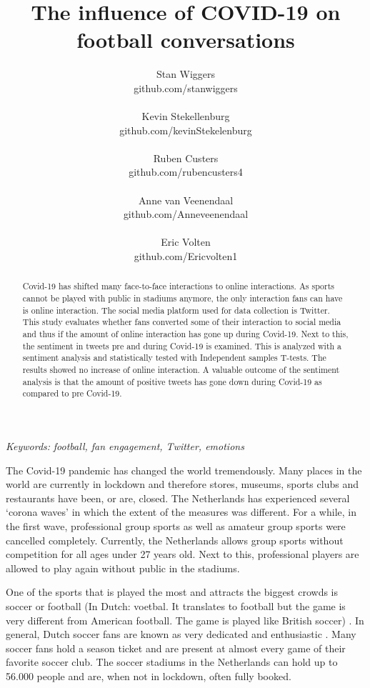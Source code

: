 \documentclass[12pt]{article}
\date{}
\title{The influence of COVID-19 on football conversations}
\author{Stan Wiggers \\ github.com/stanwiggers
\\ \\ Kevin Stekellenburg \\ github.com/kevinStekelenburg
\\ \\ Ruben Custers \\ github.com/rubencusters4
\\ \\ Anne van Veenendaal \\ github.com/Anneveenendaal
\\ \\ Eric Volten \\ github.com/Ericvolten1}
\providecommand{\keywords}[1]
{
   \small
  \textit{\hspace{-1em} Keywords: } #1
}
\begin{document}
\maketitle
\thispagestyle{fancy}
\begin{abstract}
  \noindent  Covid-19 has shifted many face-to-face interactions to online interactions. As sports cannot be played with public in stadiums anymore, the only interaction fans can have is online interaction. The social media platform used for data collection is Twitter. This study evaluates whether fans converted some of their interaction to social media and thus if the amount of online interaction has gone up during Covid-19.  Next to this, the sentiment in tweets pre and during Covid-19 is examined. This is analyzed with a sentiment analysis and statistically tested with Independent samples T-tests. The results showed no increase of online interaction. A valuable outcome of the sentiment analysis is that the amount of positive tweets has gone down during Covid-19 as compared to pre Covid-19. 
\end{abstract}

\keywords{\textit{football, fan engagement, Twitter, emotions} \vspace{8ex}}

\noindent The Covid-19 pandemic has changed the world tremendously. Many places in the world are currently in lockdown and therefore stores, museums, sports clubs and restaurants have been, or are, closed. The Netherlands has experienced several ‘corona waves’ in which the extent of the measures was different. For a while, in the first wave, professional group sports as well as amateur group sports were cancelled completely. Currently, the Netherlands allows group sports without competition for all ages under 27 years old. Next to this, professional players are allowed to play again without public in the stadiums.

One of the sports that is played the most and attracts the biggest crowds is soccer or football (In Dutch: voetbal. It translates to football but the game is very different from American football. The game is played like British soccer) \citep{boen2002behavioral}. In general, Dutch soccer fans are known as very dedicated and enthusiastic \citep{lechner2007imagined}. Many soccer fans hold a season ticket and are present at almost every game of their favorite soccer club. The soccer stadiums in the Netherlands can hold up to 56.000 people and are, when not in lockdown, often fully booked.
\end{document}
